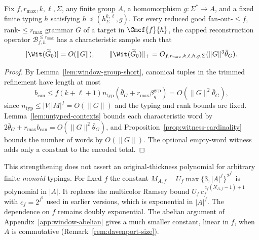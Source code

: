 \begin{theorem}
\label{thm:window-group-polydata}
Fix $f,r_{\max},k,\ell,\Sigma$, any finite group
$A$, a homomorphism $g:\Sigma^*\to A$, and a
fixed finite typing $h$ satisfying
$h\preceq(h_\Sigma^{k,\ell},g)$.
For every reduced good fan-out-$\le f$,
rank-$\le r_{\max}$ grammar $G$ of a target in
$\Cmcf{f}{h}$, the capped reconstruction operator
$\mathcal B^{\le r_{\max}}_{f,h}$ has a characteristic
sample such that
\[
 |\Wit(\widetilde G_0)|=O(\|G\|),\qquad
 \|\Wit(\widetilde G_0)\|_+
 =O_{f,r_{\max},k,\ell,h,g,\Sigma}
   (\|G\|^3\bar\theta_G).
\]
\end{theorem}
\begin{proof}
By Lemma~\ref{lem:window-group-short},
canonical tuples in the trimmed refinement have
length at most
\[
 b_{\mathrm{can}}
 \le f(k+\ell+1)n_{\mathrm{typ}}
 (\bar\theta_G+r_{\max}\beta_g^{\mathrm{grp}})
 =O(\|G\|^2\bar\theta_G),
\]
since $n_{\mathrm{typ}}\le|V||M|^f=O(\|G\|)$
and the typing and rank bounds are fixed.
Lemma~\ref{lem:untyped-contexts} bounds each
characteristic word by
$2\bar\theta_G+r_{\max}b_{\mathrm{can}}
=O(\|G\|^2\bar\theta_G)$, and
Proposition~\ref{prop:witness-cardinality}
bounds the number of words by $O(\|G\|)$.
The optional empty-word witness adds only a
constant to the encoded total.
\end{proof}

\begin{remark}
This strengthening does not assert an original-thickness
polynomial for arbitrary finite \emph{monoid} typings.
For fixed $f$ the constant
$M_{A,f}=U_f\max\{3,|A|^f\}^{2^{f^2}}$ is polynomial in
$|A|$.  It replaces the multicolor Ramsey bound
$U_f\,c_f^{\,c_f(N_{A,f}-1)+1}$ with $c_f=2^{f^2}$ used in
earlier versions, which is exponential in $|A|^f$.  The
dependence on $f$ remains doubly exponential.  The abelian
argument of Appendix~\ref{app:window-abelian} gives a much
smaller constant, linear in $f$, when $A$ is commutative
(Remark~\ref{rem:davenport-size}).
\end{remark}
